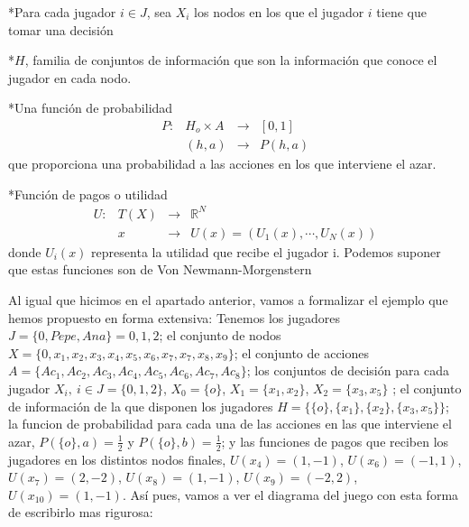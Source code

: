 \documentclass[12pt,a4paper,]{book}
\numberwithin{dummy}{section}
\theoremstyle{ocrenumbox}
\theoremstyle{blacknumex}
\theoremstyle{blacknumbox}
\theoremstyle{ocrenum}
\theoremstyle{ocrenum}
\begin{document}
*Para cada jugador \(i \in J\), sea \(X_i\) los nodos en los que el
jugador \(i\) tiene que tomar una decisión

*\(H\), familia de conjuntos de información que son la información que
conoce el jugador en cada nodo.

*Una función de probabilidad \[
\begin{array}{cccc}
P : & H_o \times A & \rightarrow & [0,1] \\
   &  (h,a) & \rightarrow   & P(h,a)
\end{array}
\] que proporciona una probabilidad a las acciones en los que interviene
el azar.

*Función de pagos o utilidad \[
\begin{array}{cccc}
U: & T(X) & \rightarrow & \mathbb{R}^N \\
   &  x & \rightarrow   & U(x)=(U_1(x),\cdots,U_N(x))
\end{array}
\] donde \(U_i(x)\) representa la utilidad que recibe el jugador i.
Podemos suponer que estas funciones son de Von Newmann-Morgenstern

Al igual que hicimos en el apartado anterior, vamos a formalizar el
ejemplo que hemos propuesto en forma extensiva: Tenemos los jugadores
\(J=\{0, Pepe, Ana\} = {0,1,2}\); el conjunto de nodos
\(X=\{0,x_1,x_2,x_3,x_4,x_5,x_6,x_7,x_7,x_8,x_9 \}\); el conjunto de
acciones \(A=\{Ac_1,Ac_2,Ac_3,Ac_4,Ac_5,Ac_6,Ac_7,Ac_8 \}\); los
conjuntos de decisión para cada jugador \(X_i, \ i \in J=\{0,1,2\}\),
\(X_0=\{o \}\), \(X_1=\{x_1,x_2 \}\), \(X_2= \{x_3,x_5 \}\) ; el
conjunto de información de la que disponen los jugadores
\(H=\{ \{o\}, \{x_1\},\{x_2\}, \{x_3,x_5\} \}\); la funcion de
probabilidad para cada una de las acciones en las que interviene el
azar, \(P(\{o\},a)=\frac{1}{2}\) y \(P(\{o\},b)=\frac{1}{2}\); y las
funciones de pagos que reciben los jugadores en los distintos nodos
finales, \(U(x_4)=(1,-1)\), \(U(x_6)=(-1,1)\), \(U(x_7)=(2,-2)\),
\(U(x_8)=(1,-1)\), \(U(x_9)=(-2,2)\), \(U(x_10)=(1,-1)\). Así pues,
vamos a ver el diagrama del juego con esta forma de escribirlo mas
rigurosa:
\end{document}
